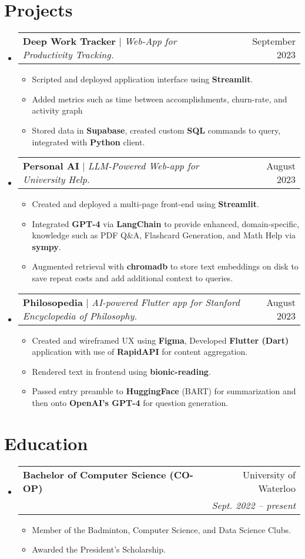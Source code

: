 \documentclass[letterpaper,11pt]{article}
\makeatletter
\newcommand{\resumeItem}[1]{
  \item\small{
    {#1 \vspace{-2pt}}
  }
}
\newcommand{\resumeSubheading}[4]{
  \vspace{-2pt}\item
    \begin{tabular*}{0.97\textwidth}[t]{l@{\extracolsep{\fill}}r}
      \textbf{#1} & #2 \\
      \textit{\small#3} & \textit{\small #4} \\
    \end{tabular*}\vspace{-7pt}
}
\newcommand{\resumeProjectHeading}[2]{
    \item
    \begin{tabular*}{0.97\textwidth}{l@{\extracolsep{\fill}}r}
      \small#1 & #2 \\
    \end{tabular*}\vspace{-7pt}
}
\newcommand{\resumeSubHeadingListStart}{\begin{itemize}[leftmargin=0.15in, label={}]}
\newcommand{\resumeSubHeadingListEnd}{\end{itemize}}
\newcommand{\resumeItemListStart}{\begin{itemize}}
\newcommand{\resumeItemListEnd}{\end{itemize}\vspace{-5pt}}
\makeatother
\begin{document}
\section{Projects}
    \resumeSubHeadingListStart
        \resumeProjectHeading
          {\textbf{Deep Work Tracker} $|$ \emph{Web-App for Productivity Tracking.}}{September 2023}
          \resumeItemListStart
                \resumeItem {Scripted and deployed application interface using \textbf{Streamlit}.}
                \resumeItem {Added metrics such as time between accomplishments, churn-rate, and activity graph}
                \resumeItem {Stored data in \textbf{Supabase}, created custom \textbf{SQL} commands to query, integrated with \textbf{Python} client.}
          \resumeItemListEnd
      \resumeProjectHeading
          {\textbf{Personal AI} $|$ \emph{LLM-Powered Web-app for University Help.}}{August 2023}
          \resumeItemListStart
                \resumeItem {Created  and deployed a multi-page front-end using \textbf{Streamlit}.}
                \resumeItem {Integrated \textbf{GPT-4} via \textbf{LangChain} to provide enhanced, domain-specific, knowledge such as PDF Q\&A, Flashcard Generation, and Math Help via \textbf{sympy}.}
                \resumeItem{Augmented retrieval with \textbf{chromadb} to store text embeddings on disk to save repeat costs and add additional context to queries.}
          \resumeItemListEnd
      \resumeProjectHeading
          {\textbf{Philosopedia} $|$ \emph{AI-powered Flutter app for Stanford Encyclopedia of Philosophy.}}{August 2023}
          \resumeItemListStart
                \resumeItem {Created and wireframed UX using \textbf{Figma}, Developed \textbf{Flutter (Dart)} application with use of \textbf{RapidAPI} for content aggregation.}
                \resumeItem {Rendered text in frontend using \textbf{bionic-reading}.}
                \resumeItem {Passed entry preamble to \textbf{HuggingFace} (BART) for summarization and then onto \textbf{OpenAI's GPT-4} for question generation.}
          \resumeItemListEnd
    \resumeSubHeadingListEnd



\section{Education}
  \resumeSubHeadingListStart
    \resumeSubheading
      {Bachelor of Computer Science (CO-OP)}{University of Waterloo}
      {}{Sept. 2022 -- present}
      \resumeItemListStart
      \resumeItem{Member of the Badminton, Computer Science, and Data Science Clubs.}
      \resumeItem{Awarded the President's Scholarship.}
      \resumeItemListEnd
  \resumeSubHeadingListEnd
\end{document}

